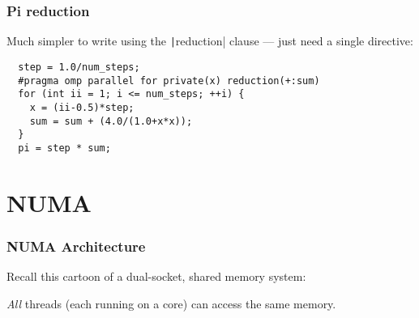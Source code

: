 \documentclass{beamer}
\begin{document}
\begin{frame}[fragile]
\frametitle{Pi reduction}
Much simpler to write using the \texttt|reduction| clause --- just need a single directive:
\begin{verbatim}
  step = 1.0/num_steps;
  #pragma omp parallel for private(x) reduction(+:sum)
  for (int ii = 1; i <= num_steps; ++i) {
    x = (ii-0.5)*step;
    sum = sum + (4.0/(1.0+x*x));
  }
  pi = step * sum;
\end{verbatim}

\end{frame}


\section{NUMA}
\begin{frame}
\frametitle{NUMA Architecture}

Recall this cartoon of a dual-socket, shared memory system:
\begin{center}
\end{center}

\emph{All} threads (each running on a core) can access the same memory.

\end{frame}
\end{document}
